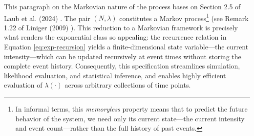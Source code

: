 \documentclass[12pt,a4paper]{report}
\theoremstyle{plain}
\theoremstyle{definition}
\theoremstyle{remark}
\newcommand{\1}{\mathbf{1}}
\begin{document}
\medskip
\noindent
This paragraph on the Markovian nature of the process bases on Section 2.5 of Laub et al. (2024) \cite{LLPT24}. The pair $(N, \lambda)$ constitutes a Markov process\footnote{In informal terms, this \emph{memoryless} property means that to predict the future behavior of the system, we need only its current state—the current intensity and event count—rather than the full history of past events.} (see Remark 1.22 of Liniger (2009) \cite{Lin09}). This reduction to a Markovian framework is precisely what renders the exponential class so appealing: the recurrence relation in Equation \eqref{eq:exp-recursion} yields a finite-dimensional state variable—the current intensity—which can be updated recursively at event times without storing the complete event history. Consequently, this specification streamlines simulation, likelihood evaluation, and statistical inference, and enables highly efficient evaluation of $\lambda(\cdot)$ across arbitrary collections of time points.
\end{document}
